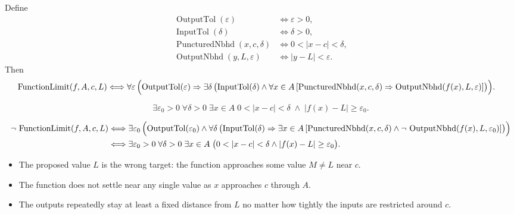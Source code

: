 \begin{remark*}
Define
\[
\begin{aligned}
  \operatorname{OutputTol}(\varepsilon)
  &\Longleftrightarrow \varepsilon>0,\\
  \operatorname{InputTol}(\delta)
  &\Longleftrightarrow \delta>0,\\
  \operatorname{PuncturedNbhd}(x,c,\delta)
  &\Longleftrightarrow 0<|x-c|<\delta,\\
  \operatorname{OutputNbhd}(y,L,\varepsilon)
  &\Longleftrightarrow |y-L|<\varepsilon.
\end{aligned}
\]
Then
\[
\begin{aligned}
  \operatorname{FunctionLimit}(f,A,c,L)
  &\Longleftrightarrow
  \forall \varepsilon\,
  \Bigl(
    \operatorname{OutputTol}(\varepsilon)
    \Rightarrow
    \exists \delta\,
    \bigl(
      \operatorname{InputTol}(\delta)
      \wedge
      \forall x\in A\,
      [
        \operatorname{PuncturedNbhd}(x,c,\delta)
        \Rightarrow
        \operatorname{OutputNbhd}(f(x),L,\varepsilon)
      ]
    \bigr)
  \Bigr).
\end{aligned}
\]
\end{remark*}

\begin{remark*}
\[
  \exists\varepsilon_0 > 0\;\forall\delta > 0\;\exists x \in A\;
  0<|x-c|<\delta\;\wedge\; |f(x)-L|\geq\varepsilon_0.
\]
\end{remark*}

\begin{remark*}
\[
\begin{aligned}
  \neg\,\operatorname{FunctionLimit}(f,A,c,L)
  &\Longleftrightarrow
  \exists \varepsilon_0\,
  \Bigl(
    \operatorname{OutputTol}(\varepsilon_0)
    \wedge
    \forall \delta\,
    \bigl(
      \operatorname{InputTol}(\delta)
      \Rightarrow
      \exists x\in A\,
      [
        \operatorname{PuncturedNbhd}(x,c,\delta)
        \wedge
        \neg\,\operatorname{OutputNbhd}(f(x),L,\varepsilon_0)
      ]
    \bigr)
  \Bigr)\\
  &\Longleftrightarrow
  \exists \varepsilon_0>0\;
  \forall \delta>0\;
  \exists x\in A\;
  \bigl(
    0<|x-c|<\delta
    \wedge
    |f(x)-L|\geq\varepsilon_0
  \bigr).
\end{aligned}
\]
\end{remark*}

\begin{remark*}\hfill
\begin{itemize}
  \item The proposed value $L$ is the wrong target: the function approaches
  some value $M\neq L$ near $c$.
  \item The function does not settle near any single value as $x$ approaches
  $c$ through $A$.
  \item The outputs repeatedly stay at least a fixed distance from $L$ no
  matter how tightly the inputs are restricted around $c$.
\end{itemize}
\end{remark*}

